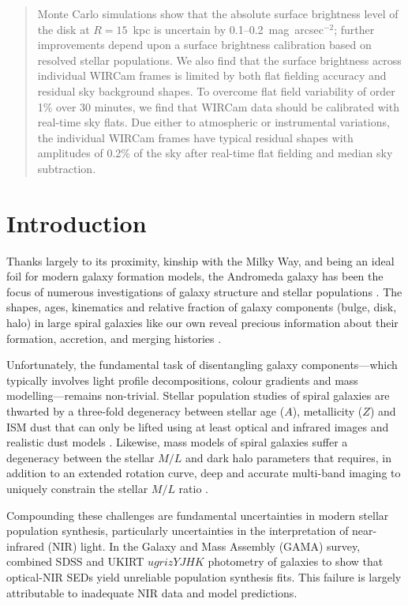 \documentclass[iop]{emulateapj}
\newcommand{\eg}{\textit{e.g.,~}}
\begin{document}
\begin{abstract}
Monte Carlo simulations show that the absolute surface brightness level of the disk at $R=15$~kpc is uncertain by 0.1--0.2~mag~arcsec$^{-2}$; further improvements depend upon a surface brightness calibration based on resolved stellar populations.
We also find that the surface brightness across individual WIRCam frames is limited by both flat fielding accuracy and residual sky background shapes.
To overcome flat field variability of order 1\% over 30 minutes, we find that WIRCam data should be calibrated with real-time sky flats.
Due either to atmospheric or instrumental variations, the individual WIRCam frames have typical residual shapes with amplitudes of 0.2\% of the sky after real-time flat fielding and median sky subtraction.
\end{abstract}

\section{Introduction}
\label{sec:intro}

Thanks largely to its proximity, kinship with the Milky Way, and being an ideal foil for modern galaxy formation models, the Andromeda galaxy has been the focus of numerous investigations of galaxy structure \citep{Ibata:2005,Irwin:2005,McConnachie:2009,Courteau:2011}
and stellar populations \citep{Williams:2002,Worthey:2005,Saglia:2010}.
The shapes, ages, kinematics and relative fraction of galaxy components (bulge, disk, halo) in large spiral galaxies like our own reveal precious information about their formation, accretion, and merging histories \citep[\eg][to cite a few]{Kormendy:2004,de-Jong:2007}.

Unfortunately, the fundamental task of disentangling galaxy components---which typically involves light profile decompositions, colour gradients and mass modelling---remains non-trivial.
Stellar population studies of spiral galaxies are thwarted by a three-fold degeneracy between stellar age ($A$), metallicity ($Z$) and ISM dust that can only be lifted using at least optical and infrared images and realistic dust models \citep{de-Jong:1996b,MacArthur:2004,Pforr:2012}.
Likewise, mass models of spiral galaxies suffer a degeneracy between the stellar $M/L$ and dark halo parameters that requires, in addition to an extended rotation curve, deep and accurate multi-band imaging to uniquely constrain the stellar $M/L$ ratio \citep{Dutton:2005}. 

Compounding these challenges are fundamental uncertainties in modern stellar population synthesis, particularly uncertainties in the interpretation of near-infrared (NIR) light.
In the Galaxy and Mass Assembly (GAMA) survey, \cite{Taylor:2011} combined SDSS and UKIRT $ugrizYJHK$ photometry of galaxies to show that optical-NIR SEDs yield unreliable population synthesis fits.
This failure is largely attributable to inadequate NIR data and model predictions.
\end{document}
